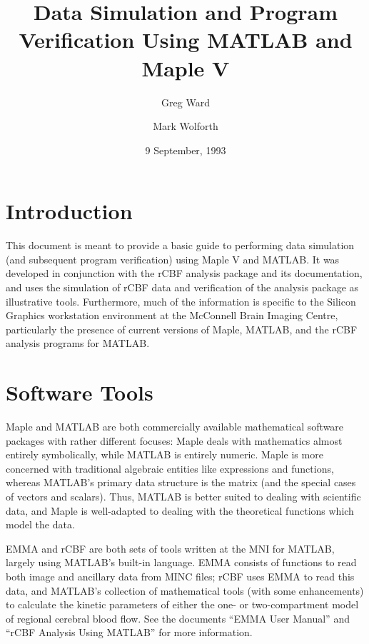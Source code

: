 \documentclass[11pt]{article}
\title{Data Simulation and Program Verification Using MATLAB and Maple V}
\author{Greg Ward \and Mark Wolforth}
\date{9 September, 1993}
\begin{document}
\maketitle

\tableofcontents

\section{Introduction}

This document is meant to provide a basic guide to performing data
simulation (and subsequent program verification) using Maple V and
MATLAB.  It was developed in conjunction with the rCBF analysis
package and its documentation, and uses the simulation of rCBF data
and verification of the analysis package as illustrative tools.
Furthermore, much of the information is specific to the Silicon
Graphics workstation environment at the McConnell Brain Imaging
Centre, particularly the presence of current versions of Maple,
MATLAB, and the rCBF analysis programs for MATLAB.

\section{Software Tools}

Maple and MATLAB are both commercially available mathematical software
packages with rather different focuses: Maple deals with mathematics
almost entirely symbolically, while MATLAB is entirely numeric.  Maple
is more concerned with traditional algebraic entities like expressions
and functions, whereas MATLAB's primary data structure is the matrix
(and the special cases of vectors and scalars).  Thus, MATLAB is
better suited to dealing with scientific data, and Maple is
well-adapted to dealing with the theoretical functions which model the
data.

EMMA and rCBF are both sets of tools written at the MNI for MATLAB,
largely using MATLAB's built-in language.  EMMA consists of functions
to read both image and ancillary data from MINC files; rCBF uses EMMA
to read this data, and MATLAB's collection of mathematical tools (with
some enhancements) to calculate the kinetic parameters of either
the one- or two-compartment model of regional cerebral blood flow.
See the documents ``EMMA User Manual'' and ``rCBF Analysis Using
MATLAB'' for more information.
\end{document}
